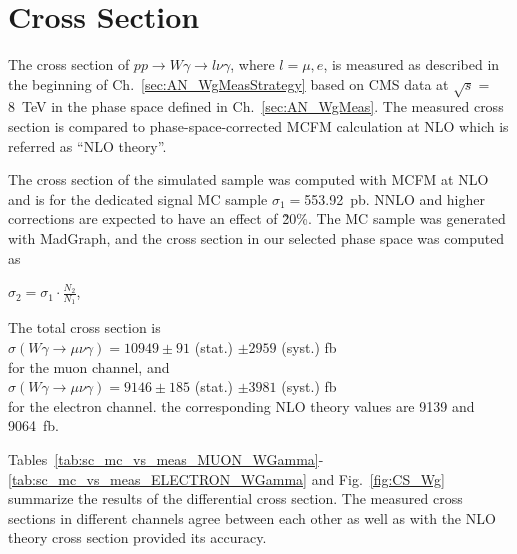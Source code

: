 \section{Cross Section}
\label{sec:AN_CrossSection}

The cross section of $pp\rightarrow W\gamma \rightarrow l\nu\gamma$, where $l=\mu,e$, is measured as described in the beginning of Ch.~\ref{sec:AN_WgMeasStrategy} based on CMS data at $\sqrt{s}=$8~TeV in the phase space defined in  Ch.~\ref{sec:AN_WgMeas}. The measured cross section is compared to phase-space-corrected MCFM calculation at NLO which is referred as ``NLO theory''.  

The cross section of the simulated sample was computed with MCFM at NLO and is for the dedicated signal MC sample $\sigma_1=$553.92~pb. NNLO and higher corrections are expected to have an effect of \~20\%. The MC sample was generated with MadGraph, and the cross section in our selected phase space was computed as 

\begin{center}
$\sigma_2 = \sigma_1 \cdot \frac{N_2}{N_1}$, 
\end{center} 



The total cross section is \\
$\sigma(W\gamma\rightarrow\mu\nu\gamma)=10949 \pm 91$ (stat.) $ \pm 2959$ (syst.) fb\\
for the muon channel, and \\
$\sigma(W\gamma\rightarrow\mu\nu\gamma)=9146 \pm 185$ (stat.) $ \pm 3981$ (syst.) fb\\
for the electron channel. the corresponding NLO theory values are 9139 and 9064~fb.

Tables~\ref{tab:sc_mc_vs_meas_MUON_WGamma}-\ref{tab:sc_mc_vs_meas_ELECTRON_WGamma} and Fig.~\ref{fig:CS_Wg} summarize the results of the differential cross section. The measured cross sections in different channels agree between each other as well as with the NLO theory cross section provided its accuracy.%


